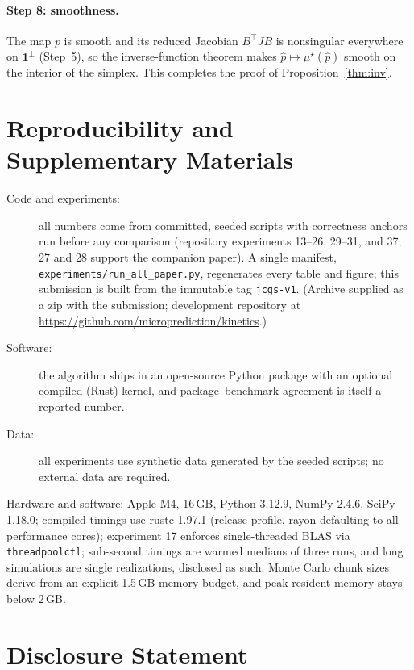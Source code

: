 \documentclass[12pt]{article}
\theoremstyle{remark}
\begin{document}
\paragraph{Step 8: smoothness.} The map $p$ is smooth and its reduced
Jacobian $B^\top J B$ is nonsingular everywhere on $\mathbf{1}^\perp$
(Step~5), so the inverse-function theorem makes $\hat p\mapsto
\mu^\star(\hat p)$ smooth on the interior of the simplex. This completes
the proof of Proposition~\ref{thm:inv}.

\section*{Reproducibility and Supplementary Materials}
\sloppy

\begin{description}
\item[Code and experiments:] all numbers come from committed, seeded
scripts with correctness anchors run before any comparison (repository
experiments 13--26, 29--31, and 37; 27 and 28 support the companion paper).
A single manifest,
\texttt{experiments/run\_all\_paper.py}, regenerates every table and
figure; this submission is built from the immutable tag
\texttt{jcgs-v1}. (Archive supplied as a zip with
the submission; development repository at
\url{https://github.com/microprediction/kinetics}.)
\item[Software:] the algorithm ships in an open-source Python package
with an optional compiled (Rust) kernel, and package--benchmark agreement
is itself a reported number.
\item[Data:] all experiments use synthetic data generated by the seeded
scripts; no external data are required.
\end{description}

Hardware and software: Apple M4, 16\,GB, Python 3.12.9,
NumPy 2.4.6, SciPy 1.18.0; compiled timings use rustc 1.97.1
(release profile, rayon defaulting to all performance cores); experiment 17 enforces single-threaded BLAS via
\texttt{threadpoolctl}; sub-second timings are warmed medians of three
runs, and long simulations are single realizations, disclosed as such.
Monte Carlo chunk sizes derive from an explicit 1.5\,GB memory budget, and
peak resident memory stays below 2\,GB.

\section*{Disclosure Statement}
\end{document}

